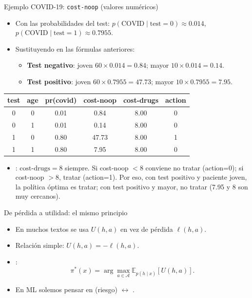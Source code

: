 \begin{frame}{Ejemplo COVID-19: \texttt{cost-noop} (valores numéricos)}
\small
\begin{itemize}
  \item Con las probabilidades del test: \(p(\text{COVID}\mid \text{test}=0)\approx 0.014\), \(p(\text{COVID}\mid \text{test}=1)\approx 0.7955\).
  \item Sustituyendo en las fórmulas anteriores:
  \begin{itemize}\small
    \item \textbf{Test negativo}: joven \(60\times 0.014 = 0.84\); mayor \(10\times 0.014 = 0.14\).
    \item \textbf{Test positivo}: joven \(60\times 0.7955 = 47.73\); mayor \(10\times 0.7955 = 7.95\).
  \end{itemize}
\end{itemize}
\vspace{0.3em}
\centering
\begin{tabular}{cccccc}
  \toprule
  test & age & pr(covid) & cost-noop & cost-drugs & action \\
  \midrule
  0 & 0 & 0.01 & 0.84  & 8.00 & 0 \\
  0 & 1 & 0.01 & 0.14  & 8.00 & 0 \\
  1 & 0 & 0.80 & 47.73 & 8.00 & 1 \\
  1 & 1 & 0.80 & 7.95  & 8.00 & 0 \\
  \bottomrule
\end{tabular}
\vspace{0.4em}
\small
\begin{itemize}
  \item {}: \(\text{cost-drugs}=8\) siempre. Si cost-noop \(<8\) conviene no tratar (action=0); si cost-noop \(>8\), tratar (action=1). Por eso, con test positivo y paciente joven, la política óptima es tratar; con test positivo y mayor, no tratar (7.95 y 8 son muy cercanos).
\end{itemize}
\end{frame}

\begin{frame}{De pérdida a utilidad: el mismo principio}
\begin{itemize}
  \item En muchos textos se usa  \(U(h,a)\) en vez de pérdida \(\ell(h,a)\).
  \item Relación simple: \(U(h,a)=-\ell(h,a)\).
  \item {}:
  \[
    \pi^*(x)=\arg\max_{a\in\mathcal{A}} \mathbb{E}_{p(h\mid x)}[U(h,a)].
  \]
  \item En ML solemos pensar en  (riesgo) \(\leftrightarrow\) .
\end{itemize}
\end{frame}

